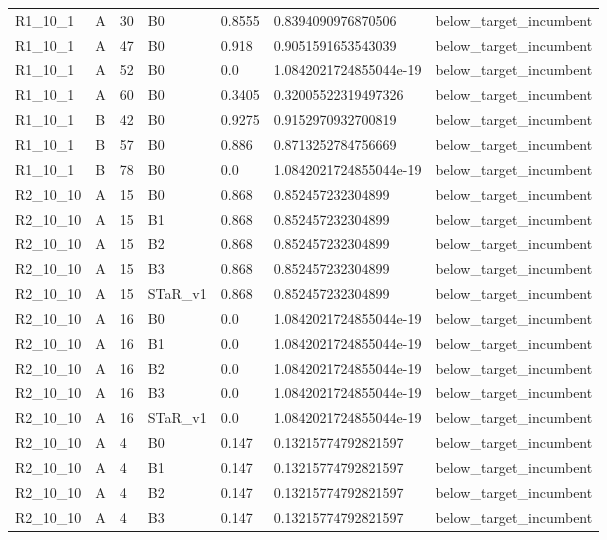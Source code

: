 \begin{tabular}{lllllll}
 R1\_10\_1 & A & 30 & B0 & 0.8555 & 0.8394090976870506 & below\_target\_incumbent \\
 R1\_10\_1 & A & 47 & B0 & 0.918 & 0.9051591653543039 & below\_target\_incumbent \\
 R1\_10\_1 & A & 52 & B0 & 0.0 & 1.0842021724855044e-19 & below\_target\_incumbent \\
 R1\_10\_1 & A & 60 & B0 & 0.3405 & 0.32005522319497326 & below\_target\_incumbent \\
 R1\_10\_1 & B & 42 & B0 & 0.9275 & 0.9152970932700819 & below\_target\_incumbent \\
 R1\_10\_1 & B & 57 & B0 & 0.886 & 0.8713252784756669 & below\_target\_incumbent \\
 R1\_10\_1 & B & 78 & B0 & 0.0 & 1.0842021724855044e-19 & below\_target\_incumbent \\
 R2\_10\_10 & A & 15 & B0 & 0.868 & 0.852457232304899 & below\_target\_incumbent \\
 R2\_10\_10 & A & 15 & B1 & 0.868 & 0.852457232304899 & below\_target\_incumbent \\
 R2\_10\_10 & A & 15 & B2 & 0.868 & 0.852457232304899 & below\_target\_incumbent \\
 R2\_10\_10 & A & 15 & B3 & 0.868 & 0.852457232304899 & below\_target\_incumbent \\
 R2\_10\_10 & A & 15 & STaR\_v1 & 0.868 & 0.852457232304899 & below\_target\_incumbent \\
 R2\_10\_10 & A & 16 & B0 & 0.0 & 1.0842021724855044e-19 & below\_target\_incumbent \\
 R2\_10\_10 & A & 16 & B1 & 0.0 & 1.0842021724855044e-19 & below\_target\_incumbent \\
 R2\_10\_10 & A & 16 & B2 & 0.0 & 1.0842021724855044e-19 & below\_target\_incumbent \\
 R2\_10\_10 & A & 16 & B3 & 0.0 & 1.0842021724855044e-19 & below\_target\_incumbent \\
 R2\_10\_10 & A & 16 & STaR\_v1 & 0.0 & 1.0842021724855044e-19 & below\_target\_incumbent \\
 R2\_10\_10 & A & 4 & B0 & 0.147 & 0.13215774792821597 & below\_target\_incumbent \\
 R2\_10\_10 & A & 4 & B1 & 0.147 & 0.13215774792821597 & below\_target\_incumbent \\
 R2\_10\_10 & A & 4 & B2 & 0.147 & 0.13215774792821597 & below\_target\_incumbent \\
 R2\_10\_10 & A & 4 & B3 & 0.147 & 0.13215774792821597 & below\_target\_incumbent \\

\end{tabular}
